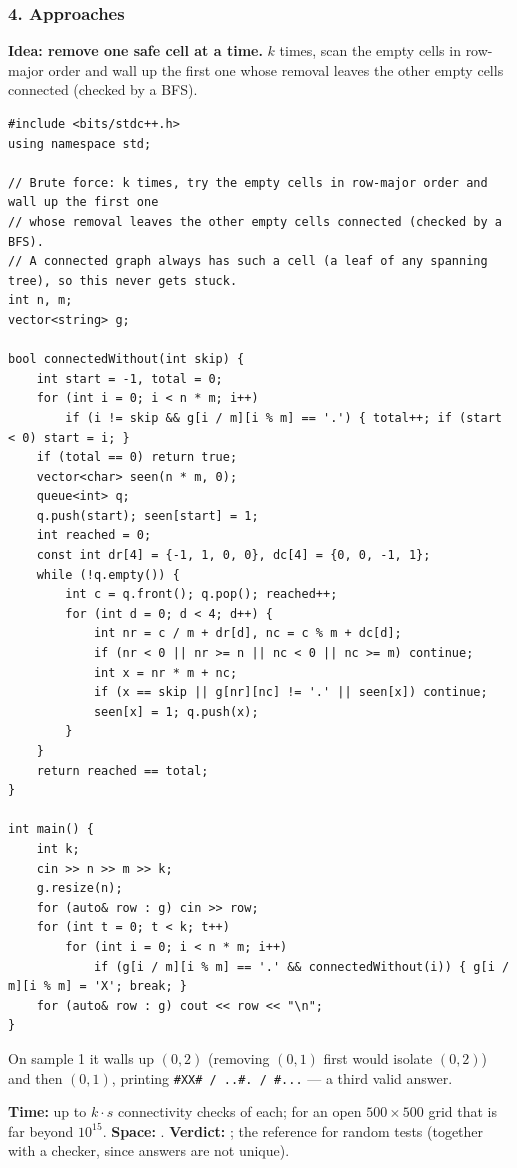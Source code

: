 \subsubsection*{4. Approaches}

\begin{bruteforcebox}
\textbf{Idea: remove one safe cell at a time.} $k$ times, scan the empty cells in row-major order and wall up the first one whose removal leaves the other empty cells connected (checked by a BFS).

\begin{lstlisting}[style=cpp]
#include <bits/stdc++.h>
using namespace std;

// Brute force: k times, try the empty cells in row-major order and wall up the first one
// whose removal leaves the other empty cells connected (checked by a BFS).
// A connected graph always has such a cell (a leaf of any spanning tree), so this never gets stuck.
int n, m;
vector<string> g;

bool connectedWithout(int skip) {
    int start = -1, total = 0;
    for (int i = 0; i < n * m; i++)
        if (i != skip && g[i / m][i % m] == '.') { total++; if (start < 0) start = i; }
    if (total == 0) return true;
    vector<char> seen(n * m, 0);
    queue<int> q;
    q.push(start); seen[start] = 1;
    int reached = 0;
    const int dr[4] = {-1, 1, 0, 0}, dc[4] = {0, 0, -1, 1};
    while (!q.empty()) {
        int c = q.front(); q.pop(); reached++;
        for (int d = 0; d < 4; d++) {
            int nr = c / m + dr[d], nc = c % m + dc[d];
            if (nr < 0 || nr >= n || nc < 0 || nc >= m) continue;
            int x = nr * m + nc;
            if (x == skip || g[nr][nc] != '.' || seen[x]) continue;
            seen[x] = 1; q.push(x);
        }
    }
    return reached == total;
}

int main() {
    int k;
    cin >> n >> m >> k;
    g.resize(n);
    for (auto& row : g) cin >> row;
    for (int t = 0; t < k; t++)
        for (int i = 0; i < n * m; i++)
            if (g[i / m][i % m] == '.' && connectedWithout(i)) { g[i / m][i % m] = 'X'; break; }
    for (auto& row : g) cout << row << "\n";
}
\end{lstlisting}
On sample 1 it walls up $(0,2)$ (removing $(0,1)$ first would isolate $(0,2)$) and then $(0,1)$, printing \texttt{\#XX\# / ..\#. / \#...} --- a third valid answer.

\begin{complexitybox}
\textbf{Time:} up to $k \cdot s$ connectivity checks of  each; for an open $500 \times 500$ grid that is far beyond $10^{15}$. \textbf{Space:} . \textbf{Verdict:} \tle{}; the reference for random tests (together with a checker, since answers are not unique).
\end{complexitybox}
\end{bruteforcebox}

